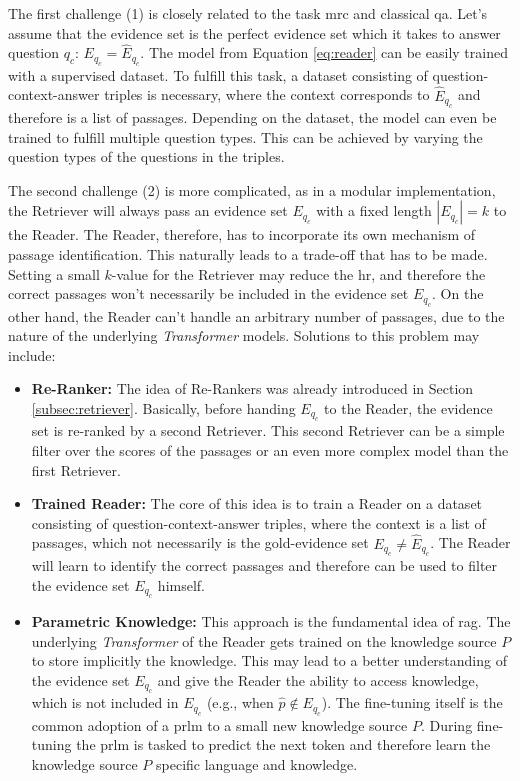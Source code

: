 The first challenge (1) is closely related to the task \gls{mrc} and classical \gls{qa}. Let's assume that the evidence set is the perfect evidence set which it takes to answer question $q_c$: $E_{q_c} = \hat{E}_{q_c}$. The model from Equation \ref{eq:reader} can be easily trained with a supervised dataset. To fulfill this task, a dataset consisting of question-context-answer triples is necessary, where the context corresponds to $\hat{E}_{q_c}$ and therefore is a list of passages. Depending on the dataset, the model can even be trained to fulfill multiple question types. This can be achieved by varying the question types of the questions in the triples.

The second challenge (2) is more complicated, as in a modular implementation, the Retriever will always pass an evidence set $E_{q_c}$ with a fixed length $|E_{q_c}| = k$ to the Reader. The Reader, therefore, has to incorporate its own mechanism of passage identification. This naturally leads to a trade-off that has to be made. Setting a small $k$-value for the Retriever may reduce the \gls{hr}, and therefore the correct passages won't necessarily be included in the evidence set $E_{q_c}$. On the other hand, the Reader can't handle an arbitrary number of passages, due to the nature of the underlying \textit{Transformer} models. Solutions to this problem may include:

\begin{itemize}
    \item \textbf{Re-Ranker:} The idea of Re-Rankers was already introduced in Section \ref{subsec:retriever}. Basically, before handing $E_{q_c}$ to the Reader, the evidence set is re-ranked by a second Retriever. This second Retriever can be a simple filter over the scores of the passages or an even more complex model than the first Retriever.
    \item \textbf{Trained Reader:} The core of this idea is to train a Reader on a dataset consisting of question-context-answer triples, where the context is a list of passages, which not necessarily is the gold-evidence set $E_{q_c} \not= \hat{E}_{q_c}$. The Reader will learn to identify the correct passages and therefore can be used to filter the evidence set $E_{q_c}$ himself.
    \item \textbf{Parametric Knowledge:} This approach is the fundamental idea of \gls{rag}. The underlying \textit{Transformer} of the Reader gets trained on the knowledge source $P$ to store implicitly the knowledge. This may lead to a better understanding of the evidence set $E_{q_c}$ and give the Reader the ability to access knowledge, which is not included in $E_{q_c}$ (e.g., when $\hat{p} \not\in E_{q_c}$). The fine-tuning itself is the common adoption of a \gls{prlm} to a small new knowledge source $P$. During fine-tuning the \gls{prlm} is tasked to predict the next token and therefore learn the knowledge source $P$ specific language and knowledge.
\end{itemize}

